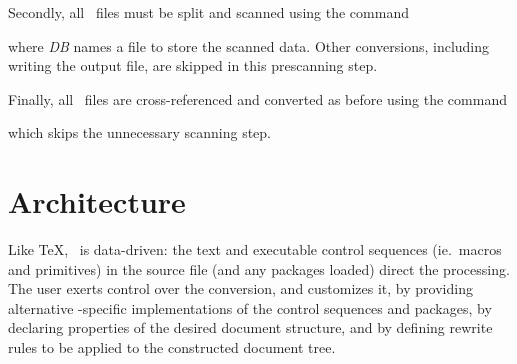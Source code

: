 \documentclass{report}
\begin{document}
Secondly, all \XML\ files must be split and scanned using
the command
\begin{quote}
\end{quote}
where \textit{DB} names a file to store the scanned data.
Other conversions, including writing the output file, are skipped in this prescanning step.

Finally, all \XML\ files are cross-referenced and converted as before
using the command
\begin{quote}
\end{quote}
which skips the unnecessary scanning step.

\chapter{Architecture}\label{architecture}
Like \TeX, \LaTeXML\ is data-driven: the text and executable control
sequences (ie.~macros and primitives)
in the source file (and any packages loaded) direct the processing.
The user exerts control over the conversion, and customizes it, by 
providing alternative \LaTeXML-specific implementations of the control sequences and packages,
by declaring properties of the desired document structure,
and by defining rewrite rules to be applied to the constructed document tree.
\end{document}
